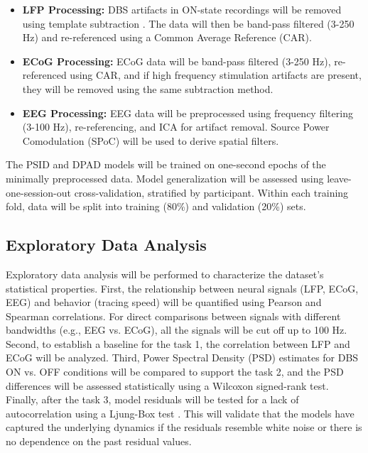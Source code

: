 \documentclass[12pt, letterpaper]{article}
\begin{document}
\begin{itemize}

    \item \textbf{LFP Processing:} DBS artifacts in ON-state recordings will be removed using template subtraction \parencite{qianMethodRemovalDeep2017,hammerArtifactCharacterizationMultipurpose2022}. The data will then be band-pass filtered (3-250 Hz) and re-referenced using a Common Average Reference (CAR).

    \item \textbf{ECoG Processing:} ECoG data will be band-pass filtered (3-250 Hz), re-referenced using CAR, and if high frequency stimulation artifacts are present, they will be removed using the same subtraction method.

    \item \textbf{EEG Processing:} EEG data will be preprocessed using frequency filtering (3-100 Hz), re-referencing, and ICA for artifact removal. Source Power Comodulation (SPoC) will be used to derive spatial filters.

\end{itemize}

The PSID and DPAD models will be trained on one-second epochs of the minimally preprocessed data. Model generalization will be assessed using leave-one-session-out cross-validation, stratified by participant. Within each training fold, data will be split into training (80\%) and validation (20\%) sets.

\subsection{Exploratory Data Analysis}

Exploratory data analysis will be performed to characterize the dataset's statistical properties. First, the relationship between neural signals (LFP, ECoG, EEG) and behavior (tracing speed) will be quantified using Pearson and Spearman correlations. For direct comparisons between signals with different bandwidths (e.g., EEG vs. ECoG), all the signals will be cut off up to 100 Hz. Second, to establish a baseline for the task 1, the correlation between LFP and ECoG will be analyzed. Third, Power Spectral Density (PSD) estimates for DBS ON vs. OFF conditions will be compared to support the task 2, and the PSD differences will be assessed statistically using a Wilcoxon signed-rank test. Finally, after the task 3, model residuals will be tested for a lack of autocorrelation using a Ljung-Box test \parencite{ljungMeasureLackFit1978}. This will validate that the models have captured the underlying dynamics if the residuals resemble white noise or there is no dependence on the past residual values.
\end{document}
